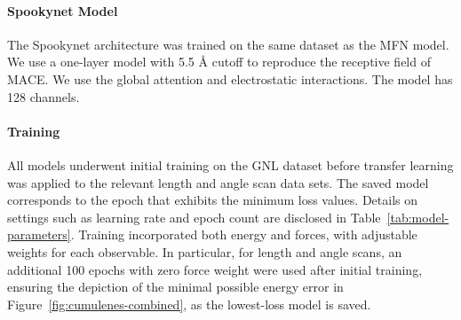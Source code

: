 \documentclass{article} \usepackage{iclr2024_conference,times}
\begin{document}
\paragraph{Spookynet Model}

The Spookynet architecture was trained on the same dataset as the MFN model. We use a one-layer model with 5.5 \r{A} cutoff to reproduce the receptive field of MACE. We use the global attention and electrostatic interactions. The model has 128 channels.

\paragraph{Training}
All models underwent initial training on the GNL dataset before transfer learning was applied to the relevant length and angle scan data sets. The saved model corresponds to the epoch that exhibits the minimum loss values. Details on settings such as learning rate and epoch count are disclosed in Table~\ref{tab:model-parameters}. Training incorporated both energy and forces, with adjustable weights for each observable. In particular, for length and angle scans, an additional 100 epochs with zero force weight were used after initial training, ensuring the depiction of the minimal possible energy error in Figure~\ref{fig:cumulenes-combined}, as the lowest-loss model is saved.


\begin{table}[h]
    \centering
    \caption{Model training parameters. For the matrix functions the number of poles ($n_p$) and matrix channels ($c$) are indicated. }
    \label{tab:model-parameters}
\end{table}
\end{document}
